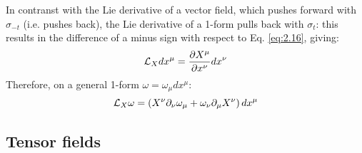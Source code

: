 In contranst with the Lie derivative of a vector field, which pushes forward with $ \sigma_{-t} $ (i.e. pushes back), the Lie derivative of a 1-form pulls back with $ \sigma_t $: this results in the difference of a minus sign with respect to Eq. \ref{eq:2.16}, giving:
\begin{equation}
  \mathcal{L}_X dx^{\mu} = \frac{\partial X^{\mu}}{\partial x^{\nu}} dx^{\nu}
  \label{eq:2.22}
\end{equation}
Therefore, on a general 1-form $ \omega = \omega_{\mu} dx^{\mu} $:
\begin{equation}
  \mathcal{L}_X \omega = \left( X^{\nu} \partial_{\nu} \omega_{\mu} + \omega_{\nu} \partial_{\mu} X^{\nu} \right) dx^{\mu}
  \label{eq:2.23}
\end{equation}

\subsection{Tensor fields}










